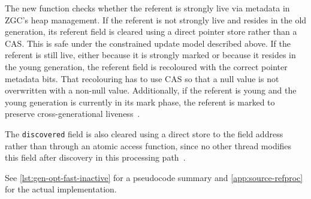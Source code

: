 The new function checks whether the referent is strongly live via metadata in \ac{ZGC}'s heap management. If the referent is not strongly live and resides in the old generation, its referent field is cleared using a direct pointer store rather than a \ac{CAS}. This is safe under the constrained update model described above. If the referent is still live, either because it is strongly marked or because it resides in the young generation, the referent field is recoloured with the correct pointer metadata bits. That recolouring has to use \ac{CAS} so that a null value is not overwritten with a non-null value. Additionally, if the referent is young and the young generation is currently in its mark phase, the referent is marked to preserve cross-generational liveness~\cite{openjdk-zreferenceprocessor-cpp,openjdk-zbarrier-cpp,openjdk-zgeneration-cpp}.

The \texttt{discovered} field is also cleared using a direct store to the field address rather than through an atomic access function, since no other thread modifies this field after discovery in this processing path~\cite{openjdk-zreferenceprocessor-cpp}.

See \cref{lst:gen-opt-fast-inactive} for a pseudocode summary and \cref{app:source-refproc} for the actual implementation.

